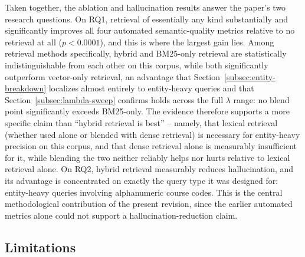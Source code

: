 \documentclass[a4paper,twoside]{article}
\begin{document}
Taken together, the ablation and hallucination results answer the paper's two research questions. On RQ1, retrieval of essentially any kind substantially and significantly improves all four automated semantic-quality metrics relative to no retrieval at all ($p<0.0001$), and this is where the largest gain lies. Among retrieval methods specifically, hybrid and BM25-only retrieval are statistically indistinguishable from each other on this corpus, while both significantly outperform vector-only retrieval, an advantage that Section~\ref{subsec:entity-breakdown} localizes almost entirely to entity-heavy queries and that Section~\ref{subsec:lambda-sweep} confirms holds across the full $\lambda$ range: no blend point significantly exceeds BM25-only. The evidence therefore supports a more specific claim than ``hybrid retrieval is best'' -- namely, that lexical retrieval (whether used alone or blended with dense retrieval) is necessary for entity-heavy precision on this corpus, and that dense retrieval alone is measurably insufficient for it, while blending the two neither reliably helps nor hurts relative to lexical retrieval alone. On RQ2, hybrid retrieval measurably reduces hallucination, and its advantage is concentrated on exactly the query type it was designed for: entity-heavy queries involving alphanumeric course codes. This is the central methodological contribution of the present revision, since the earlier automated metrics alone could not support a hallucination-reduction claim.

\subsection{Limitations}
\end{document}
